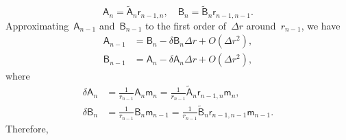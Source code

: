 \documentclass[preprint,10pt,times]{elsarticle}
\numberwithin{equation}{section}
\renewcommand{\u}[1]{\boldsymbol{#1}}
\newcommand{\usf}[1]{\u{\mathsf #1}}
\renewcommand{\>}{$\Rightarrow$}
\begin{document}
\begin{equation}
	\usf{A}_n = \tilde{\usf{A}}_{n}  \usf{r}_{n-1,n}, \quad
	\usf{B}_n = \tilde{\usf{B}}_{n}  \usf{r}_{n-1,n-1}.
\end{equation}
Approximating~$\usf{A}_{n-1}$ and~$\usf{B}_{n-1}$ to the first order of~$\Delta r$ around~$r_{n-1}$, we have
\begin{subequations}
\begin{align}
	\usf{A}_{n-1} & = \usf{B}_{n} - \delta \usf{B}_{n} \Delta r + O(\Delta r^2), \\
	\usf{B}_{n-1} & = \usf{A}_{n} - \delta \usf{A}_{n} \Delta r + O(\Delta r^2),
\end{align}
\end{subequations}
where
\begin{subequations}
	\begin{align}
	\delta \usf{A}_{n} & = \frac{1}{r_{n-1}} \usf{A}_{n} \usf{m}_n = \frac{1}{r_{n-1}} \tilde{\usf{A}}_{n} \usf{r}_{n-1,n} \usf{m}_n, \\
	\delta \usf{B}_{n} & = \frac{1}{r_{n-1}} \usf{B}_{n} \usf{m}_{n-1} = \frac{1}{r_{n-1}} \tilde{\usf{B}}_{n} \usf{r}_{n-1,n-1} \usf{m}_{n-1}.
	\end{align}
\end{subequations}
Therefore,
\end{document}
